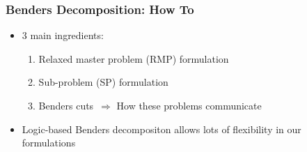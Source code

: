 \documentclass{beamer}
\begin{document}


\begin{frame}
\frametitle{Benders Decomposition: How To}
\begin{itemize}
	\item 3 main ingredients:\vspace{2mm}\pause
	\begin{enumerate}
		\item Relaxed master problem (RMP) formulation \vspace{2mm}\pause
		\item Sub-problem (SP) formulation \vspace{2mm}\pause
		\item Benders cuts~$\Rightarrow$ How these problems communicate\vspace{3mm}\pause
	\end{enumerate}
	\item Logic-based Benders decompositon allows lots of flexibility in our formulations
\end{itemize}
\end{frame}
\end{document}
